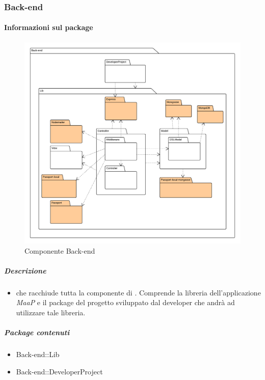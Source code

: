 
  \subsubsection{Back-end}
  \paragraph{Informazioni sul package} 
    \begin{figure}[H] 
      \begin{center} 
        \includegraphics[width=\textwidth]{packages/Back-end.png}  
        \caption{Componente Back-end}
      \end{center}  
    \end{figure} 
  \subparagraph{Descrizione} 
    \begin{itemize}
    \item[]  che racchiude tutta la componente di . Comprende la libreria dell'applicazione \textit{MaaP} e il package del progetto sviluppato dal developer che andrà ad utilizzare tale libreria.
    \end{itemize} 
    \subparagraph{Package contenuti} 
    \begin{itemize}
        \item Back-end::Lib
        \item Back-end::DeveloperProject
    \end{itemize}
